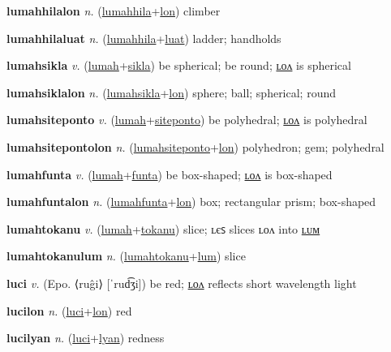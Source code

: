 \textbf{\hypertarget{lumahhilalon}{lumahhilalon}} \textit{n.} (\hyperlink{lumahhila}{lumahhila}+\allowbreak \hyperlink{lon}{lon})
climber

\textbf{\hypertarget{lumahhilaluat}{lumahhilaluat}} \textit{n.} (\hyperlink{lumahhila}{lumahhila}+\allowbreak \hyperlink{luat}{luat})
ladder; handholds

\textbf{\hypertarget{lumahsikla}{lumahsikla}} \textit{v.} (\hyperlink{lumah}{lumah}+\allowbreak \hyperlink{sikla}{sikla})
be spherical; be round; \hyperlink{lumahsiklalon}{ʟᴏᴧ} is spherical

\textbf{\hypertarget{lumahsiklalon}{lumahsiklalon}} \textit{n.} (\hyperlink{lumahsikla}{lumahsikla}+\allowbreak \hyperlink{lon}{lon})
sphere; ball; spherical; round

\textbf{\hypertarget{lumahsiteponto}{lumahsiteponto}} \textit{v.} (\hyperlink{lumah}{lumah}+\allowbreak \hyperlink{siteponto}{siteponto})
be polyhedral; \hyperlink{lumahsitepontolon}{ʟᴏᴧ} is polyhedral

\textbf{\hypertarget{lumahsitepontolon}{lumahsitepontolon}} \textit{n.} (\hyperlink{lumahsiteponto}{lumahsiteponto}+\allowbreak \hyperlink{lon}{lon})
polyhedron; gem; polyhedral

\textbf{\hypertarget{lumahfunta}{lumahfunta}} \textit{v.} (\hyperlink{lumah}{lumah}+\allowbreak \hyperlink{funta}{funta})
be box-shaped; \hyperlink{lumahfuntalon}{ʟᴏᴧ} is box-shaped

\textbf{\hypertarget{lumahfuntalon}{lumahfuntalon}} \textit{n.} (\hyperlink{lumahfunta}{lumahfunta}+\allowbreak \hyperlink{lon}{lon})
box; rectangular prism; box-shaped

\textbf{\hypertarget{lumahtokanu}{lumahtokanu}} \textit{v.} (\hyperlink{lumah}{lumah}+\allowbreak \hyperlink{tokanu}{tokanu})
slice; ʟєꜱ slices ʟᴏᴧ into \hyperlink{lumahtokanulum}{ʟᴜᴍ}

\textbf{\hypertarget{lumahtokanulum}{lumahtokanulum}} \textit{n.} (\hyperlink{lumahtokanu}{lumahtokanu}+\allowbreak \hyperlink{lum}{lum})
slice

\textbf{\hypertarget{luci}{luci}} \textit{v.} (Epo. ⟨ruĝi⟩ [ˈrud͡ʒi])
be red; \hyperlink{lucilon}{ʟᴏᴧ} reflects short wavelength light

\textbf{\hypertarget{lucilon}{lucilon}} \textit{n.} (\hyperlink{luci}{luci}+\allowbreak \hyperlink{lon}{lon})
red

\textbf{\hypertarget{lucilyan}{lucilyan}} \textit{n.} (\hyperlink{luci}{luci}+\allowbreak \hyperlink{lyan}{lyan})
redness

